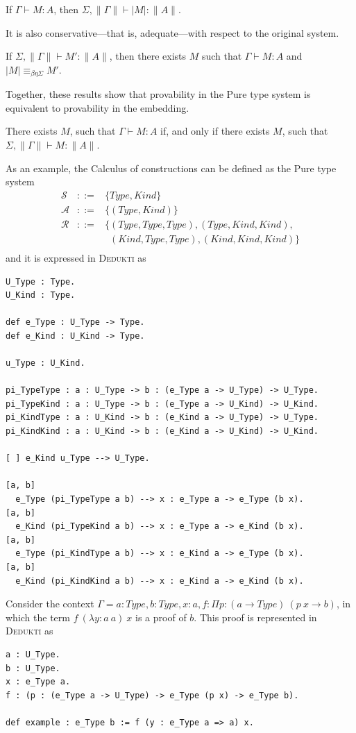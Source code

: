 \documentclass[english]{lipics}
\begin{document}
\begin{lemma}
If $\Gamma \vdash M : A$, then $\Sigma, \|\Gamma\| \vdash |M| : \|A\|$.
\end{lemma}

It is also conservative---that is, adequate---with respect to the
original system.

\begin{lemma}
If $\Sigma, \|\Gamma\| \vdash M' : \|A\|$, then there exists $M$ such that $\Gamma \vdash M : A$ and $|M| \equiv_{\beta\eta\Sigma} M'$.
\end{lemma}

Together, these results show that provability in the Pure type system
is equivalent to provability in the embedding.
\begin{theorem} There exists $M$, such that $\Gamma
  \vdash M : A$ if, and only if there exists $M$, such that $\Sigma,
  \|\Gamma\| \vdash M : \|A\|$.
\end{theorem}

As an example, the Calculus of constructions can be defined as the Pure type system
$$
\begin{array}{lll}
\mathcal S & ::= & \{Type, Kind\} \\
\mathcal A & ::= & \{(Type, Kind)\} \\
\mathcal R & ::= & \{(Type,Type,Type), (Type,Kind,Kind), \\
           &   & \phantom{\{}(Kind, Type, Type), (Kind, Kind, Kind)\} \\
\end{array}
$$
and it is expressed in \textsc{Dedukti} as
\begin{lstlisting}
U_Type : Type.
U_Kind : Type.

def e_Type : U_Type -> Type.
def e_Kind : U_Kind -> Type.

u_Type : U_Kind.

pi_TypeType : a : U_Type -> b : (e_Type a -> U_Type) -> U_Type.
pi_TypeKind : a : U_Type -> b : (e_Type a -> U_Kind) -> U_Kind.
pi_KindType : a : U_Kind -> b : (e_Kind a -> U_Type) -> U_Type.
pi_KindKind : a : U_Kind -> b : (e_Kind a -> U_Kind) -> U_Kind.

[ ] e_Kind u_Type --> U_Type.

[a, b]
  e_Type (pi_TypeType a b) --> x : e_Type a -> e_Type (b x).
[a, b]
  e_Kind (pi_TypeKind a b) --> x : e_Type a -> e_Kind (b x).
[a, b]
  e_Type (pi_KindType a b) --> x : e_Kind a -> e_Type (b x).
[a, b]
  e_Kind (pi_KindKind a b) --> x : e_Kind a -> e_Kind (b x).
\end{lstlisting}
Consider the context $\Gamma = a : Type, b : Type, x : a, f : \Pi p : (a \to Type)~(p~x \to b)$, in which the term $f~(\lambda y:a~a)~x$ is a proof of $b$. This proof is represented in \textsc{Dedukti} as
\begin{lstlisting}
a : U_Type.
b : U_Type.
x : e_Type a.
f : (p : (e_Type a -> U_Type) -> e_Type (p x) -> e_Type b).

def example : e_Type b := f (y : e_Type a => a) x.
\end{lstlisting}
\end{document}
